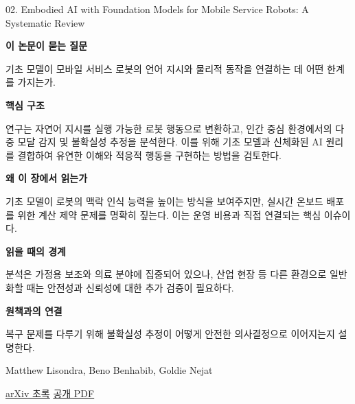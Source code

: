 \documentclass[11pt,openany]{book}
\begin{document}
\begin{termcard}{02. Embodied AI with Foundation Models for Mobile Service Robots: A Systematic Review}

\par

\medskip

{\sffamily\bfseries\color{deepblue} 이 논문이 묻는 질문}\par

기초 모델이 모바일 서비스 로봇의 언어 지시와 물리적 동작을 연결하는 데 어떤 한계를 가지는가.

\smallskip

{\sffamily\bfseries\color{deepblue} 핵심 구조}\par

연구는 자연어 지시를 실행 가능한 로봇 행동으로 변환하고, 인간 중심 환경에서의 다중 모달 감지 및 불확실성 추정을 분석한다. 이를 위해 기초 모델과 신체화된 AI 원리를 결합하여 유연한 이해와 적응적 행동을 구현하는 방법을 검토한다.

\smallskip

{\sffamily\bfseries\color{deepblue} 왜 이 장에서 읽는가}\par

기초 모델이 로봇의 맥락 인식 능력을 높이는 방식을 보여주지만, 실시간 온보드 배포를 위한 계산 제약 문제를 명확히 짚는다. 이는 운영 비용과 직접 연결되는 핵심 이슈이다.

\smallskip

{\sffamily\bfseries\color{coral} 읽을 때의 경계}\par

분석은 가정용 보조와 의료 분야에 집중되어 있으나, 산업 현장 등 다른 환경으로 일반화할 때는 안전성과 신뢰성에 대한 추가 검증이 필요하다.

\smallskip

{\sffamily\bfseries\color{teal} 원책과의 연결}\par

복구 문제를 다루기 위해 불확실성 추정이 어떻게 안전한 의사결정으로 이어지는지 설명한다.

\medskip

{\footnotesize\color{muted} Matthew Lisondra, Beno Benhabib, Goldie Nejat\par

\href{https://arxiv.org/abs/2505.20503}{arXiv 초록} \quad \href{https://arxiv.org/pdf/2505.20503}{공개 PDF}\par}

\end{termcard}
\end{document}
